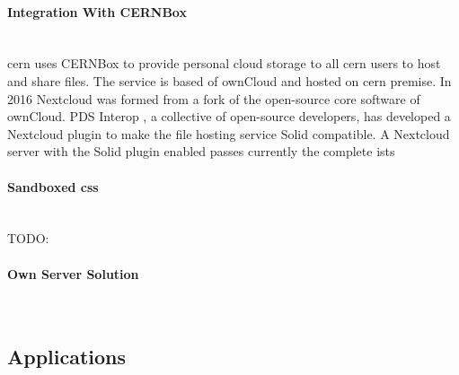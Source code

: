 \paragraph{Integration With CERNBox}\mbox{}\\

\gls{cern} uses CERNBox \cite{cernbox} to provide personal cloud storage to all \gls{cern} users to host and share files. The service is based of ownCloud \cite{owncloud} and hosted on \gls{cern} premise. In 2016 Nextcloud \cite{nextcloud} was formed from a fork of the open-source core software of ownCloud. PDS Interop \cite{pds-interop}, a collective of open-source developers, has developed a Nextcloud \cite{nextcloud} plugin to make the file hosting service Solid compatible. A Nextcloud server with the Solid plugin enabled passes currently the complete \gls{ists}



\vspace{0.5cm}
\paragraph{Sandboxed \gls{css}}\mbox{}\\

TODO:
\vspace{0.5cm}
\paragraph{Own Server Solution}\mbox{}\\

\subsection{Applications}
